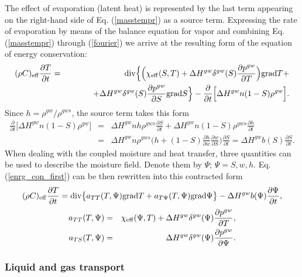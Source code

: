 The effect of evaporation (latent heat) is represented by the last term appearing on the right-hand 
side of Eq. (\ref{masstempr}) as a source term. Expressing the rate of evaporation by means of the balance 
equation for vapor and combining Eq. (\ref{masstempr}) through (\ref{fourier}) we arrive at the resulting 
form of the equation of energy conservation:
\begin{eqnarray}\label{enrg_con_first}
( \rho C)_{\rm eff} \frac{\partial T}{\partial t} &=& {\rm div} \Big\{ \Big(\chi_{\rm eff} (S, 
T) + \Delta H^{gw} \delta^{gw}(S) \frac{\partial p^{gw}}{\partial T} \Big) {\rm grad} T +\\ 
& &\qquad \quad + \Delta H^{gw} \delta^{gw}(S) \frac{\partial p^{gw}}{\partial S} {\rm grad} S \Big\} 
- \frac{\partial}{\partial t}
\Big[\Delta H^{gw} n(1-S) \rho^{gw} \Big].\nonumber
\end{eqnarray}
Since $h = \rho^{gw}/\rho^{gws}$, the source term takes this form
\begin{eqnarray}
\frac{\partial}{\partial t} \Big[\Delta H^{gw} n(1-S) \rho^{gw} \Big] &=& \Delta H^{gw} n h \rho^{gws} 
\frac{\partial S}{\partial t} + \Delta H^{gw} n (1 - S)\rho^{gws} \frac{\partial h}{\partial t}\\
&=& \Delta H^{gw} n \rho^{gws} \Big(h + (1-S)\frac{\partial h}{\partial w} \frac{\partial w}{\partial S} \Big) 
\frac{\partial S}{\partial t} = \Delta H^{gw} b(S) \frac{\partial S}{\partial t}\nonumber.
\end{eqnarray}
When dealing with the coupled moisture and heat transfer, three quantities can be used to describe the moisture field. 
Denote them by $\varPsi$; 
$\varPsi = S, w, h$. 
Eq. (\ref{enrg_con_first}) can be then rewritten into this contracted form
\begin{eqnarray}
( \rho C)_{\rm eff} \frac{\partial T}{\partial t} = {\rm div} \big\{ a_{T T} (T, \Psi) {\rm grad} T + 
a_{T \Psi} (T, \Psi) {\rm grad} \Psi \big\} - \Delta H^{gw} b(\Psi)\frac{\partial \Psi}{\partial t},
\end{eqnarray}
\begin{eqnarray}
a_{T T} (T, \Psi) &=& \chi_{\rm eff} (\Psi,T) + \Delta H^{gw} \delta^{gw}(\Psi) \frac{\partial p^{gw}}{\partial T},
\nonumber\\
a_{T S} (T, \Psi) &=& \Delta H^{gw} \delta^{gw}(\Psi) \frac{\partial p^{gw}}{\partial \Psi}.\nonumber
\end{eqnarray}

\subsubsection{Liquid and gas transport}
\label{ssec1_4_2}

